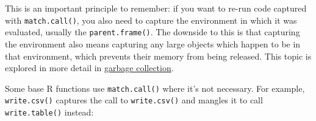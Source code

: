 \begin{Shaded}
\begin{Highlighting}[]
\StringTok{ }
  \StringTok{ }
  \StringTok{ } 
\NormalTok{\}}
\StringTok{ }\NormalTok{()}
 

\StringTok{ }
  \StringTok{ }
  \NormalTok{(}
\NormalTok{\}}
 
\CommentTok{#> }
\CommentTok{#> }
\end{Highlighting}
\end{Shaded}

This is an important principle to remember: if you want to re-run code
captured with \texttt{match.call()}, you also need to capture the
environment in which it was evaluated, usually the
\texttt{parent.frame()}. The downside to this is that capturing the
environment also means capturing any large objects which happen to be in
that environment, which prevents their memory from being released. This
topic is explored in more detail in \hyperref[gc]{garbage collection}.

Some base R functions use \texttt{match.call()} where it's not
necessary. For example, \texttt{write.csv()} captures the call to
\texttt{write.csv()} and mangles it to call \texttt{write.table()}
instead:

